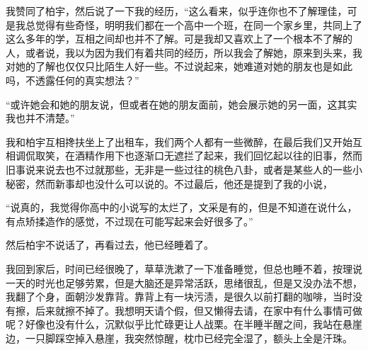我赞同了柏宇，然后说了一下我的经历，“这么看来，似乎连你也不了解理佳，可是我总觉得有些奇怪，明明我们都在一个高中一个班，在同一个家乡里，共同上了这么多年的学，互相之间却也并不了解。可是我却又喜欢上了一个根本不了解的人，或者说，我以为因为我们有着共同的经历，所以我会了解她，原来到头来，我对她的了解也仅仅只比陌生人好一些。不过说起来，她难道对她的朋友也是如此吗，不透露任何的真实想法？”

“或许她会和她的朋友说，但或者在她的朋友面前，她会展示她的另一面，这其实我也并不清楚。”

我和柏宇互相搀扶坐上了出租车，我们两个人都有一些微醉，在最后我们又开始互相调侃取笑，在酒精作用下也逐渐口无遮拦了起来，我们回忆起以往的旧事，然而旧事说来说去也不过就那些，无非是一些过往的桃色八卦，或者是某些人的一些小秘密，然而新事却也没什么可以说的。不过最后，他还是提到了我的小说，

“说真的，我觉得你高中的小说写的太烂了，文采是有的，但是不知道在说什么，有点矫揉造作的感觉，不过现在可能写起来会好很多了。”

然后柏宇不说话了，再看过去，他已经睡着了。

我回到家后，时间已经很晚了，草草洗漱了一下准备睡觉，但总也睡不着，按理说一天的时光也足够劳累，但是大脑还是异常活跃，思绪很乱，但是又没办法不想，我翻了个身，面朝沙发靠背。靠背上有一块污渍，是很久以前打翻的咖啡，当时没有擦，后来就擦不掉了。我想明天请个假，但又懒得去请，在家中有什么事情可做呢？好像也没有什么，沉默似乎比忙碌更让人战栗。在半睡半醒之间，我站在悬崖边，一只脚踩空掉入悬崖，我突然惊醒，枕巾已经完全湿了，额头上全是汗珠。
